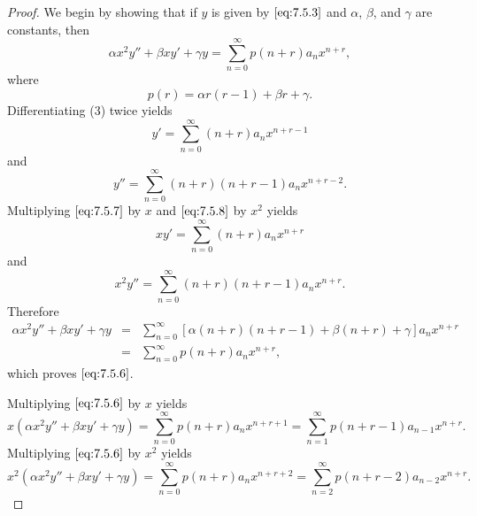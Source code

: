 \documentclass{ximera}
\begin{document}
\begin{proof}
We begin by showing that if $y$ is given by $\eqref{eq:7.5.3}$ and
$\alpha$, $\beta$, and $\gamma$ are constants, then
\begin{equation} \label{eq:7.5.6}
\alpha x^2y''+\beta xy'+\gamma y=
\sum_{n=0}^\infty p(n+r)a_nx^{n+r},
\end{equation}
where
$$
p(r)=\alpha r(r-1)+\beta r +\gamma.
$$
Differentiating (3)  twice yields
\begin{equation} \label{eq:7.5.7}
y'=\sum_{n=0}^\infty (n+r)a_nx^{n+r-1}
\end{equation}
and
\begin{equation} \label{eq:7.5.8}
y''=\sum_{n=0}^\infty (n+r)(n+r-1)a_nx^{n+r-2}.
\end{equation}
Multiplying $\eqref{eq:7.5.7}$ by $x$ and $\eqref{eq:7.5.8}$ by $x^2$ yields
$$
xy'=\sum_{n=0}^\infty (n+r)a_nx^{n+r}
$$
and
$$
x^2y''=\sum_{n=0}^\infty (n+r)(n+r-1)a_nx^{n+r}.
$$
Therefore
\begin{eqnarray*}
\alpha x^2y''+\beta xy'+\gamma y
&=&\sum_{n=0}^\infty\left[\alpha(n+r)(n+r-1)+\beta(n+r)+\gamma\right]a_n
x^{n+r}\\
&=&\sum_{n=0}^\infty p(n+r)a_nx^{n+r},
\end{eqnarray*}
which proves $\eqref{eq:7.5.6}$.

Multiplying $\eqref{eq:7.5.6}$ by $x$ yields
\begin{equation} \label{eq:7.5.9}
x(\alpha x^2y''+\beta xy'+\gamma
y)=\sum_{n=0}^\infty p(n+r) a_nx^{n+r+1}=
\sum_{n=1}^\infty p(n+r-1)a_{n-1}x^{n+r}.
\end{equation}
Multiplying $\eqref{eq:7.5.6}$ by $x^2$ yields
\begin{equation} \label{eq:7.5.10}
x^2(\alpha x^2y''+\beta xy'+\gamma
y)=\sum_{n=0}^\infty p(n+r)a_nx^{n+r+2}=
\sum_{n=2}^\infty p(n+r-2)a_{n-2}x^{n+r}.
\end{equation}


\end{proof}
\end{document}
